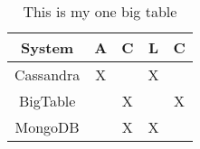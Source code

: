 \begin{table}
	\centering
\begin{tabular}{|c|c|c|c|c|}
	\hline 
	System & A & C & L & C \\ 
	\hline 
	Cassandra & X &  & X &  \\ 
	\hline 
	BigTable &  & X &  & X \\ 
	\hline 
	MongoDB &  & X & X &  \\ 
	\hline 
\end{tabular}
  \caption{This is my one big table} \label{tab:PACELC}
\end{table}

